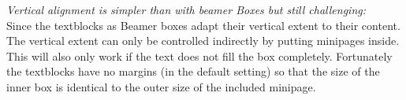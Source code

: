 

 
\alert{\textit{Vertical alignment is simpler than with beamer Boxes but still challenging:}}
\\
Since the textblocks as Beamer boxes  adapt their vertical extent to their content.
The vertical extent can only be controlled indirectly by putting minipages inside.
This will also only work if the text does not fill the box completely.
Fortunately the textblocks have no margins (in the default setting) so that the
size of the inner box is identical to the outer size of the included minipage.


%  
%  
%  
%
